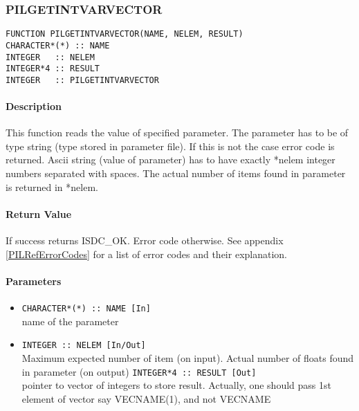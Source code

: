 
\subsubsection{PILGETINTVARVECTOR}

\begin{verbatim}
FUNCTION PILGETINTVARVECTOR(NAME, NELEM, RESULT) 
CHARACTER*(*) :: NAME 
INTEGER   :: NELEM
INTEGER*4 :: RESULT 
INTEGER   :: PILGETINTVARVECTOR
\end{verbatim}

\paragraph{Description\\}
This function reads the value of specified parameter. The parameter has
to be of type string (type stored in parameter file). If this is not the
case error code is returned. Ascii string (value of parameter) has to have
exactly *nelem integer numbers separated with spaces. The actual number
of items found in parameter is returned in *nelem.

\paragraph{Return Value\\}
If success returns ISDC\_OK. Error code otherwise. See appendix \ref{PILRefErrorCodes}
for a list of error codes and their explanation.

\paragraph{Parameters}
\begin{itemize}
\item
{\tt CHARACTER*(*) :: NAME [In] } \\
name of the parameter 
\item
{\tt INTEGER   :: NELEM [In/Out] } \\
Maximum expected number of item (on input). Actual number of floats found in
parameter (on output)
{\tt INTEGER*4 :: RESULT [Out] } \\
pointer to vector of integers to store result. Actually, one should
pass 1st element of vector say VECNAME(1), and not VECNAME
\end{itemize}



